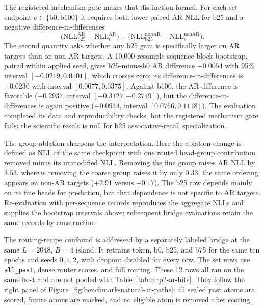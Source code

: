 \documentclass{article}
\theoremstyle{plain}
\theoremstyle{definition}
\theoremstyle{remark}
\begin{document}
The registered mechanism gate makes that distinction formal.  For each set
endpoint $e\in\{\mathrm{b0},\mathrm{b100}\}$ it requires both lower paired AR
NLL for b25 and a negative difference-in-differences
\[
 \bigl(\mathrm{NLL}^{\mathrm{AR}}_{\mathrm{b25}}
       -\mathrm{NLL}^{\mathrm{AR}}_e\bigr)
 -\bigl(\mathrm{NLL}^{\mathrm{nonAR}}_{\mathrm{b25}}
       -\mathrm{NLL}^{\mathrm{nonAR}}_e\bigr).
\]
The second quantity asks whether any b25 gain is specifically larger on AR
targets than on non-AR targets.  A 10{,}000-resample sequence-block bootstrap,
paired within applied seed, gives b25-minus-b0 AR difference $-0.0054$ with
95\% interval $[-0.0219,0.0101]$, which crosses zero; its
difference-in-differences is $+0.0230$ with interval $[0.0077,0.0375]$.  Against
b100, the AR difference is favorable ($-0.2937$, interval
$[-0.3127,-0.2749]$), but the difference-in-differences is again positive
($+0.0944$, interval $[0.0766,0.1118]$).  The evaluation completed its data and
reproducibility checks, but the registered mechanism gate fails: the scientific
result is null for b25 associative-recall specialization.

The group ablation sharpens the interpretation.  Here the ablation change is
defined as NLL of the same checkpoint with one routed head-group contribution
removed minus its unmodified NLL.  Removing the fine group raises AR NLL by
$3.53$, whereas removing the coarse group raises it by only $0.33$; the same
ordering appears on non-AR targets ($+2.91$ versus $+0.17$).  The b25 row
depends mainly on its fine heads for prediction, but that dependence is not
specific to AR targets.  Re-evaluation with per-sequence records reproduces
the aggregate NLLs and supplies the bootstrap intervals above; subsequent
bridge evaluations retain the same records by construction.

\FloatBarrier

The routing-recipe confound is addressed by a separately labeled bridge at the
same $L=2048$, $B=4$ island.  It retrains token, b0, b25, and b75 for the same
ten epochs and seeds $0,1,2$, with dropout disabled for every row.  The set rows
use \texttt{all\_past}, dense router scores, and full routing.  These 12 rows
all ran on the same host and are not pooled with
Table~\ref{tab:mrp2-ar-hits}.  They follow the right panel of
Figure~\ref{fig:benchmark-natural-ar-paths}: all sealed past atoms are scored,
future atoms are masked, and no eligible atom is removed after scoring.
\end{document}
